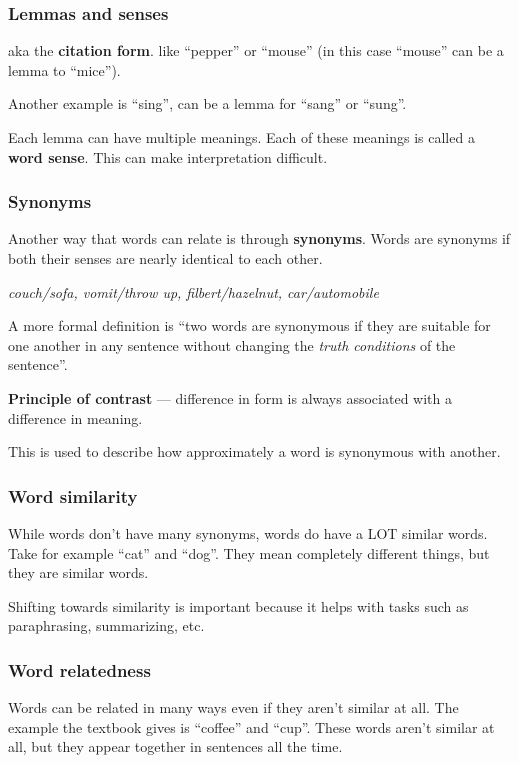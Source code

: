 \documentclass[11pt]{article}
\begin{document}
\subsubsection{Lemmas and senses}

aka the \textbf{citation form}. like ``pepper'' or ``mouse'' (in this case
``mouse'' can be a lemma to ``mice'').

Another example is ``sing'', can be a lemma for ``sang'' or ``sung''.

Each lemma can have multiple meanings. Each of these meanings is called a
\textbf{word sense}. This can make interpretation difficult.

\subsubsection{Synonyms}

Another way that words can relate is through \textbf{synonyms}. Words are
synonyms if both their senses are nearly identical to each other.

\textit{couch/sofa, vomit/throw up, filbert/hazelnut, car/automobile}

A more formal definition is ``two words are synonymous if they are suitable for
one another in any sentence without changing the \textit{truth conditions} of
the sentence''.

\textbf{Principle of contrast} --- difference in form is always associated with a
difference in meaning.

This is used to describe how approximately a word is synonymous with another.

\subsubsection{Word similarity}

While words don't have many synonyms, words do have a LOT similar words. Take
for example ``cat'' and ``dog''. They mean completely different things, but they
are similar words.

Shifting towards similarity is important because it helps with tasks such as
paraphrasing, summarizing, etc.

\subsubsection{Word relatedness}

Words can be related in many ways even if they aren't similar at all. The
example the textbook gives is ``coffee'' and ``cup''. These words aren't similar
at all, but they appear together in sentences all the time.
\end{document}

